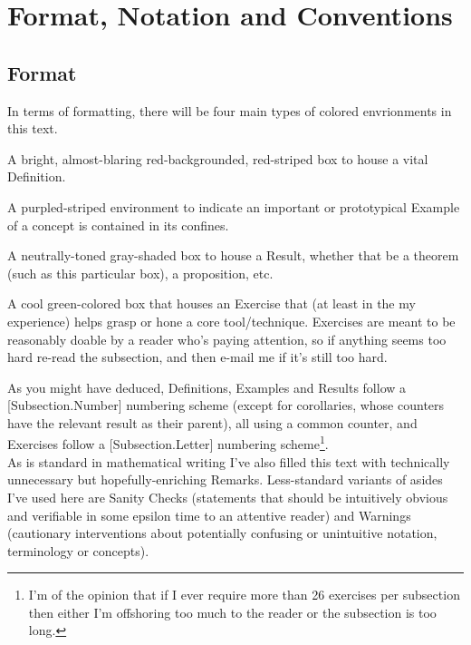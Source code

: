 \documentclass[11pt, x11names, openany]{book}
\newcounter{exercises}
\begin{document}
\newpage

\section*{Format, Notation and Conventions}
\label{section: Format, Notation and Conventions}

\subsection*{Format}
In terms of formatting, there will be four main types of colored envrionments in this text.
\begin{defn} 
    A bright, almost-blaring red-backgrounded, red-striped box to house a vital Definition.
\end{defn}
\begin{example}
    A purpled-striped environment to indicate an important or prototypical Example of a concept is contained in its confines.
\end{example}
\begin{theorem}
    A neutrally-toned gray-shaded box to house a Result, whether that be a theorem (such as this particular box), a proposition, etc.
\end{theorem}
\begin{exercise}
    A cool green-colored box that houses an Exercise that (at least in the my experience) helps grasp or hone a core tool/technique. Exercises are meant to be reasonably doable by a reader who's paying attention, so if anything seems too hard re-read the subsection, and then e-mail me if it's still too hard.
\end{exercise}

As you might have deduced, Definitions, Examples and Results follow a [Subsection.Number] numbering scheme (except for corollaries, whose counters have the relevant result as their parent), all using a common counter, and Exercises follow a [Subsection.Letter] numbering scheme\footnote{I'm of the opinion that if I ever require more than 26 exercises per subsection then either I'm offshoring too much to the reader or the subsection is too long.}.\\

As is standard in mathematical writing I've also filled this text with technically unnecessary but hopefully-enriching Remarks. Less-standard variants of asides I've used here are Sanity Checks (statements that should be intuitively obvious and verifiable in some epsilon time to an attentive reader) and Warnings (cautionary interventions about potentially confusing or unintuitive notation, terminology or concepts).\\
\end{document}

